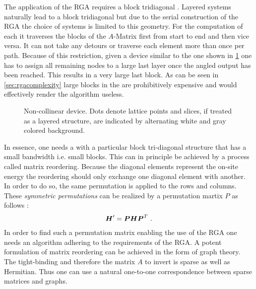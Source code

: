 The application of the RGA requires a block tridiagonal \hamil{}. Layered systems naturally lead to a block tridiagonal \hamil{} but due to the serial construction of the RGA the choice of systems is limited to this geometry. For the computation of each \gfnc{} it traverses the blocks of the $A$-Matrix first from start to end and then vice versa. It can not take any detours or traverse each element more than once per path. Because of this restriction, given a device similar to the one shown in \cref{fig:noncollinear} one has to assign all remaining nodes to a large last layer once the angled output has been reached. This results in a very large last block. As can be seen in \cref{sec:rgacomplexity} large blocks in the \hamil{} are prohibitively expensive and would effectively render the algorithm useless.
\begin{figure}[!ht]
\centering
{}
\caption{Non-collinear device. Dots denote lattice points and slices, if treated as a layered structure, are indicated by alternating white and gray colored background.}
\label{fig:noncollinear}
\end{figure}
In essence, one needs a \hamil{} with a particular block tri-diagonal structure that has a small bandwidth i.e. small blocks. This can in principle be achieved by a process called matrix reordering. Because the diagonal elements represent the on-site energy the reordering should only exchange one diagonal element with another. In order to do so, the same permutation is applied to the rows and columns. These \emph{symmetric permutations} can be realized by a permutation martix $P$ as follows \cite{saad2003iterative}:
\begin{align}
\boldsymbol{H}' = \boldsymbol{P} \boldsymbol{H} \boldsymbol{P}^{T}\ .
\label{eqn:permutation}
\end{align}
In order to find such a permutation matrix enabling the use of the RGA one needs an algorithm adhering to the requirements of the RGA.
A potent formulation of matrix reordering can be achieved in the form of graph theory. The tight-binding \hamil{} and therefore the matrix $A$ to invert is sparse as well as Hermitian. Thus one can use a natural one-to-one correspondence between sparse matrices and graphs.
